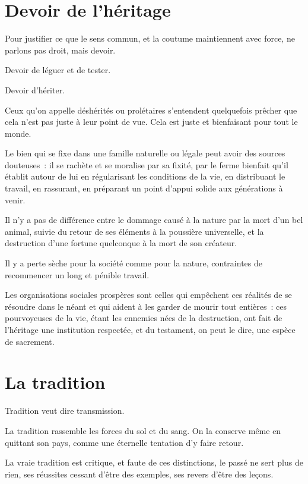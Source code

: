 \documentclass[french,twoside]{book} %
\newcommand{\astermono}{\medskip\centerline{\color{rubric}\large\selectfont{\syms ✻}}\medskip\par}%
\begin{document}
\section[{Devoir de l’héritage}]{Devoir de l’héritage}
\noindent Pour justifier ce que le sens commun, et la coutume maintiennent avec force, ne parlons pas droit, mais devoir.\par
Devoir de léguer et de tester.\par
Devoir d’hériter.\par
Ceux qu’on appelle déshérités ou prolétaires s’entendent quelquefois prêcher que cela n’est pas juste à leur point de vue. Cela est juste et bienfaisant pour tout le monde.\par
Le bien qui se fixe dans une famille naturelle ou légale peut avoir des sources douteuses : il se rachète et se moralise par sa fixité, par le ferme bienfait qu’il établit autour de lui en régularisant les conditions de la vie, en distribuant le travail, en rassurant, en préparant un point d’appui solide aux générations à venir.\par
Il n’y a pas de différence entre le dommage causé à la nature par la mort d’un bel animal, suivie du retour de ses éléments à la poussière universelle, et la destruction d’une fortune quelconque à la mort de son créateur.\par
Il y a perte sèche pour la société comme pour la nature, contraintes de recommencer un long et pénible travail.\par
Les organisations sociales prospères sont celles qui empêchent ces réalités de se résoudre dans le néant et qui aident à les garder de mourir tout entières : ces pourvoyeuses de la vie, étant les ennemies nées de la destruction, ont fait de l’héritage une institution respectée, et du testament, on peut le dire, une espèce de sacrement.
\section[{La tradition}]{La tradition}
\noindent Tradition veut dire transmission.\par

\astermono

\noindent La tradition rassemble les forces du sol et du sang. On la conserve même en quittant son pays, comme une éternelle tentation d’y faire retour.\par

\astermono

\noindent La vraie tradition est critique, et faute de ces distinctions, le passé ne sert plus de rien, ses réussites cessant d’être des exemples, ses revers d’être des leçons.\par
\end{document}
